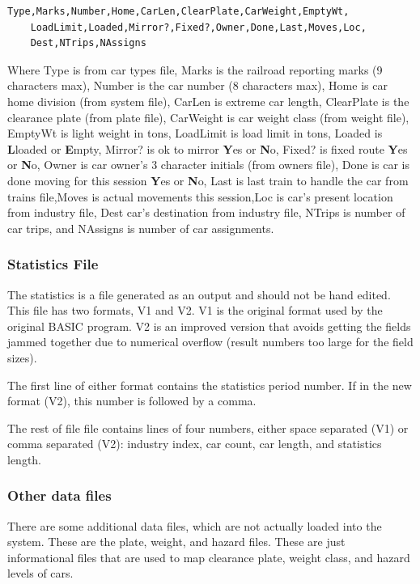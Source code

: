 {\footnotesize
\begin{verbatim}
Type,Marks,Number,Home,CarLen,ClearPlate,CarWeight,EmptyWt,
	LoadLimit,Loaded,Mirror?,Fixed?,Owner,Done,Last,Moves,Loc,
	Dest,NTrips,NAssigns
\end{verbatim}
}
Where Type is from car types file, Marks is the railroad reporting
marks (9 characters max), Number is the car number (8 characters max),
Home is car home division (from system file), CarLen is extreme car
length, ClearPlate is the clearance plate (from plate file), CarWeight
is car weight class (from weight file), EmptyWt is light weight in
tons, LoadLimit is load limit in tons, Loaded is \textbf{L}loaded or
\textbf{E}mpty, Mirror? is ok to mirror \textbf{Y}es or \textbf{N}o,
Fixed? is fixed route \textbf{Y}es or \textbf{N}o, Owner is car owner's
3 character initials (from owners file), Done is car is done moving for
this session \textbf{Y}es or \textbf{N}o, Last is last train to handle
the car from trains file,Moves is actual movements this session,Loc is
car's present location from industry file, Dest car's destination from
industry file, NTrips is number of car trips, and NAssigns is number of
car assignments.

\subsubsection{Statistics File}

The statistics is a file generated as an output and should not be hand
edited.  This file has two formats, V1 and V2.  V1 is the original
format used by the original BASIC program.  V2 is an improved version
that avoids getting the fields jammed together due to numerical overflow
(result numbers too large for the field sizes).

The first line of either format contains the statistics period number. 
If in the new format (V2), this number is followed by a comma.

The rest of file file contains lines of four numbers, either space
separated (V1) or comma separated (V2): industry index, car count, car
length, and statistics length.

\subsubsection{Other data files}

There are some additional data files, which are not actually loaded into
the system.  These are the plate, weight, and hazard files.  These are
just informational files that are used to map clearance plate, weight
class, and hazard levels of cars.


